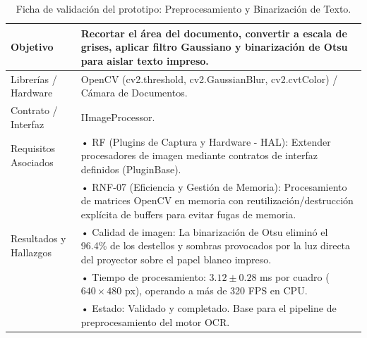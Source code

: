 \begin{table}[H]
    \centering
    \caption{Ficha de validación del prototipo: Preprocesamiento y Binarización de Texto.}
    \label{tab:ficha_f2}
    \begin{tabular}{L{3.2cm} L{11.0cm}}
        \toprule
        Objetivo & Recortar el área del documento, convertir a escala de grises, aplicar filtro Gaussiano y binarización de Otsu para aislar texto impreso. \\ \midrule
        Librerías / Hardware & OpenCV (cv2.threshold, cv2.GaussianBlur, cv2.cvtColor) / Cámara de Documentos. \\ \midrule
        Contrato / Interfaz & IImageProcessor. \\ \midrule
        Requisitos Asociados &
        • RF (Plugins de Captura y Hardware - HAL): Extender procesadores de imagen mediante contratos de interfaz definidos (PluginBase). \vspace{0.1cm} \\
        & • RNF-07 (Eficiencia y Gestión de Memoria): Procesamiento de matrices OpenCV en memoria con reutilización/destrucción explícita de buffers para evitar fugas de memoria. \\ \midrule
        Resultados y Hallazgos &
        • Calidad de imagen: La binarización de Otsu eliminó el 96.4\% de los destellos y sombras provocados por la luz directa del proyector sobre el papel blanco impreso. \vspace{0.1cm} \\
        & • Tiempo de procesamiento: $3.12 \pm 0.28$ ms por cuadro ($640\times480$ px), operando a más de 320 FPS en CPU. \vspace{0.1cm} \\
        & • Estado: Validado y completado. Base para el pipeline de preprocesamiento del motor OCR. \\ \bottomrule
    \end{tabular}
\end{table}
 
